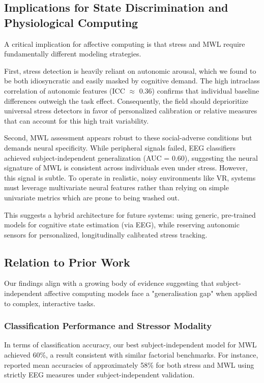 \documentclass[lettersize,journal]{IEEEtran}
\begin{document}
\subsection{Implications for State Discrimination and Physiological Computing}

A critical implication for affective computing is that stress and MWL require fundamentally different modeling strategies.

First, stress detection is heavily reliant on autonomic arousal, which we found to be both idiosyncratic and easily masked by cognitive demand. The high intraclass correlation of autonomic features (ICC $\approx$ 0.36) confirms that individual baseline differences outweigh the task effect. Consequently, the field should deprioritize universal stress detectors in favor of personalized calibration or relative measures that can account for this high trait variability.

Second, MWL assessment appears robust to these social-adverse conditions but demands neural specificity. While peripheral signals failed, EEG classifiers achieved subject-independent generalization (AUC = 0.60), suggesting the neural signature of MWL is consistent across individuals even under stress. However, this signal is subtle. To operate in realistic, noisy environments like VR, systems must leverage multivariate neural features rather than relying on simple univariate metrics which are prone to being washed out.

This suggests a hybrid architecture for future systems: using generic, pre-trained models for cognitive state estimation (via EEG), while reserving autonomic sensors for personalized, longitudinally calibrated stress tracking.

\subsection{Relation to Prior Work}

Our findings align with a growing body of evidence suggesting that subject-independent affective computing models face a "generalisation gap" when applied to complex, interactive tasks. 

\subsubsection{Classification Performance and Stressor Modality}
In terms of classification accuracy, our best subject-independent model for MWL achieved 60\%, a result consistent with similar factorial benchmarks. For instance, \cite{bagheriSimultaneousClassificationBoth2022} reported mean accuracies of approximately 58\% for both stress and MWL using strictly EEG measures under subject-independent validation. 
\end{document}
